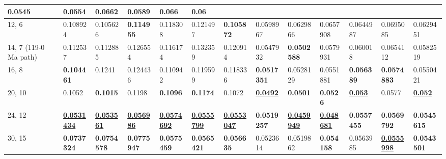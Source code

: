 \begin{table*}
{\begin{tabular}{|l|l|l|l|l|l|l|l|l|l|l|l|l|}
  0.0545 & 0.0554 & 0.0662 & 0.0589 & 0.066 & 0.06 \\ \hline
12, 6 & 0.108924 & 0.105626 & {\color[HTML]{34FF34} \textbf{0.114955}} & 0.118308 & 0.121497 & {\color[HTML]{34FF34} \textbf{0.105872}} & 0.0598967 & 0.0629866 & 0.0657908 & 0.0644987 & 0.0695085 & 0.0629451 \\ \hline
14, 7 (119-0 Ma path) & 0.112537 & 0.112885 & 0.126554 & 0.116174 &
  0.132359 & 0.120914 & 0.0547932 & {\color[HTML]{34FF34} \textbf{0.0502588}} & 0.0579931 & 0.060018 & 0.0654112 & 0.0582519 \\ \hline
16, 8 & {\color[HTML]{34FF34} \textbf{0.104461}} & 0.1241 & 0.124436 & 0.110942 & 0.119599 & 0.118336 & {\color[HTML]{32CB00} \textbf{0.0517351}} & 0.0528129 & 0.0551881 & {\color[HTML]{34FF34} \textbf{0.056389}} & {\color[HTML]{34FF34} \textbf{0.0574883}} & 0.0550421 \\ \hline
20, 10 & 0.1052 & {\color[HTML]{34FF34} \textbf{0.1015}} & 0.1198 & {\color[HTML]{34FF34} \textbf{0.1096}} & {\color[HTML]{34FF34} \textbf{0.1174}} & 0.1072 & {\color[HTML]{009901} {\ul \textbf{0.0492}}} & {\color[HTML]{32CB00} \textbf{0.0501}}
  & {\color[HTML]{32CB00} \textbf{0.0526}} & {\color[HTML]{009901} {\ul \textbf{0.053}}} & 0.0577 & {\color[HTML]{009901} {\ul \textbf{0.052}}} \\ \hline
24, 12 & {\color[HTML]{009901} {\ul \textbf{0.0531434}}} & {\color[HTML]{009901} {\ul \textbf{0.053561}}} & {\color[HTML]{009901} {\ul \textbf{0.056986}}} & {\color[HTML]{009901} {\ul \textbf{0.0574692}}} & {\color[HTML]{009901} {\ul \textbf{0.0555799}}} & {\color[HTML]{009901} {\ul \textbf{0.0553047}}} & {\color[HTML]{34FF34} \textbf{0.0519257}} & {\color[HTML]{009901} {\ul
  \textbf{0.0459949}}} & {\color[HTML]{009901} {\ul \textbf{0.048681}}} & {\color[HTML]{32CB00} \textbf{0.0557455}} & {\color[HTML]{32CB00} \textbf{0.0569792}} & {\color[HTML]{34FF34} \textbf{0.0545615}} \\ \hline
30, 15 & {\color[HTML]{32CB00} \textbf{0.0737324}} & {\color[HTML]{32CB00} \textbf{0.0754578}} & {\color[HTML]{32CB00} \textbf{0.0775947}} & {\color[HTML]{32CB00} \textbf{0.0575459}} & {\color[HTML]{32CB00} \textbf{0.0565421}} & {\color[HTML]{32CB00} \textbf{0.056635}} & 0.0523614 & 0.0519862 & {\color[HTML]{34FF34} \textbf{0.054158}} & 0.0563985 & {\color[HTML]{009901} {\ul \textbf{0.0555998}}} & {\color[HTML]{32CB00} \textbf{0.0543501}} \\ \hline
\end{tabular}%
}
\end{table*}
